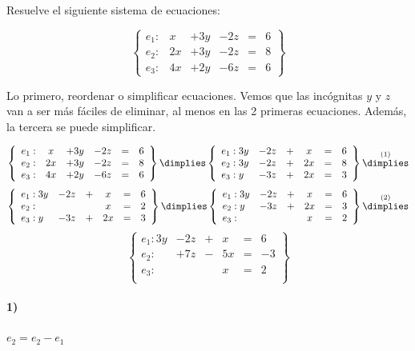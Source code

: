 \documentclass[palatino,nosec,nochap]{Docencia}
\begin{document}
\newpage

\begin{problem}

Resuelve el siguiente sistema de ecuaciones:

\[
\left\{\begin{array}{lccccc}
e_1: &x&+3y&-2z&=&6\\
e_2: &2x&+3y&-2z&=&8\\
e_3: &4x&+2y&-6z&=&6
\end{array}\right\}
\]

\solution

Lo primero, reordenar o simplificar ecuaciones. Vemos que las incógnitas $y$ y $z$ van a ser más fáciles de eliminar, al menos en las 2 primeras ecuaciones. Además, la tercera se puede simplificar.


\[
\left\{\begin{array}{lccccc}
e_1: &x&+3y&-2z&=&6\\
e_2: &2x&+3y&-2z&=&8\\
e_3: &4x&+2y&-6z&=&6
\end{array}\right\}
\dimplies
\left\{\begin{array}{lccccc}
e_1: 3y&-2z&+&x&=&6\\
e_2: 3y&-2z&+&2x&=&8\\
e_3: y&-3z&+&2x&=&3
\end{array}\right\}
\overset{(1)}{\dimplies}
\]
\[
\left\{\begin{array}{lccccc}
e_1: 3y&-2z&+&x&=&6\\
e_2: &&&x&=&2\\
e_3: y&-3z&+&2x&=&3
\end{array}\right\}
\dimplies
\left\{\begin{array}{lccccc}
e_1: 3y&-2z&+&x&=&6\\
e_2: y&-3z&+&2x&=&3\\
e_3: &&&x&=&2
\end{array}\right\}
\overset{(2)}{\dimplies}\]
\[
\left\{\begin{array}{lccccc}
e_1: 3y&-2z&+&x&=&6\\
e_2: &+7z&-&5x&=&-3\\
e_3: &&&x&=&2\\
\end{array}\right\}
\]


\paragraph{1)}
$e_2 = e_2-e_1$


\end{problem}
\end{document}
